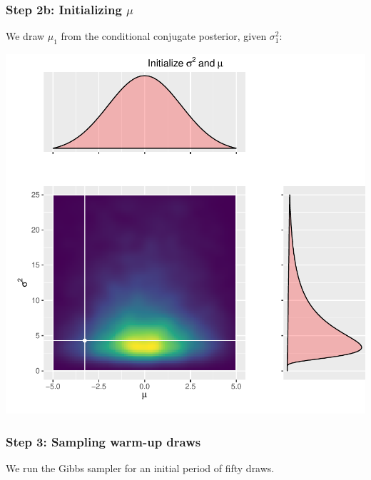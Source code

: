 \documentclass[
  11pt,
]{article}
\begin{document}
\hypertarget{step-2b-initializing-mu}{%
\subsubsection{\texorpdfstring{Step 2b: Initializing \(\mu\)}{Step 2b: Initializing \textbackslash mu}}\label{step-2b-initializing-mu}}

We draw \(\mu_1\) from the conditional conjugate posterior, given
\(\sigma_1^2\):

\begin{center}\includegraphics{01-02-lec_files/figure-latex/initialize-mu-1} \end{center}

\hypertarget{step-3-sampling-warm-up-draws}{%
\subsubsection{Step 3: Sampling warm-up draws}\label{step-3-sampling-warm-up-draws}}

We run the Gibbs sampler for an initial period of fifty draws.
\end{document}
